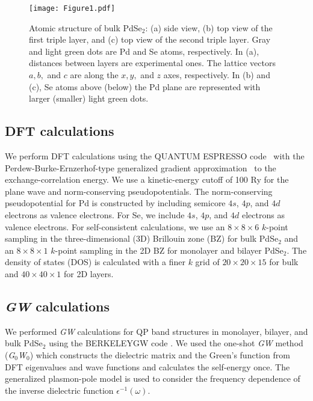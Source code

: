 \documentclass[aps,prb,longbibliography,twocolumn]{revtex4-2}
\begin{document}
\begin{figure}
\texttt{[image: Figure1.pdf]}
\caption{\label{fig1pdse2}Atomic structure of bulk PdSe$_2$:
(a) side view, (b) top view of the first triple layer,
and (c) top view of the second triple layer.
Gray and light green dots are Pd and Se atoms, respectively. 
In (a), distances between layers are experimental ones.
The lattice vectors $a, b,$ and $c$ are along the $x, y,$ and $z$ axes, respectively.
In (b) and (c), Se atoms above (below) the Pd plane are represented with larger (smaller) light green dots.}
\end{figure}


\subsection{DFT calculations}

We perform DFT calculations \cite{Hohenberg1964, Kohn1965} using the QUANTUM ESPRESSO 
code~\cite{Giannozzi2009} with the Perdew-Burke-Ernzerhof-type 
generalized gradient approximation~\cite{Perdew1996} to 
the exchange-correlation energy. We use a kinetic-energy cutoff of 100 Ry 
for the plane wave and norm-conserving pseudopotentials. 
The norm-conserving pseudopotential for Pd is constructed by including 
semicore $4s$, $4p$, and $4d$ electrons as valence electrons. 
For Se, we include $4s$, $4p$, and $4d$ electrons as valence electrons.
For self-consistent calculations, we use an $8{\times}8{\times}6$ 
$k$-point sampling in the three-dimensional (3D) Brillouin zone (BZ) 
for bulk PdSe$_2$ and an $8{\times}8{\times}1$ $k$-point sampling in the
2D BZ for monolayer and bilayer PdSe$_2$. 
The density of states (DOS) is calculated with a finer $k$ grid of 
$20{\times}20{\times}15$ for bulk and $40{\times}40{\times}1$ for 2D 
layers.


\subsection{{\em GW} calculations}

We performed {\em GW} calculations for QP band structures in monolayer, 
bilayer, and bulk PdSe$_2$ using the BERKELEYGW 
code \cite{Deslippe2012,Hybertsen1986,Rohlfing2000}.
We used the one-shot {\em GW} method ({\em G}$_0${\em W}$_0$) which constructs the 
dielectric matrix and the Green's function from DFT eigenvalues
and wave functions and calculates the self-energy once. 
The generalized plasmon-pole model is used to consider the frequency 
dependence of the inverse dielectric function $\epsilon^{-1}(\omega)$. 
\end{document}
